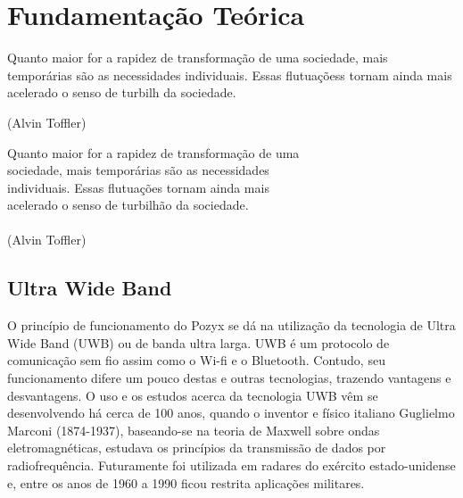 \chapter{Fundamentação Teórica}
\label{chap:fundteor}

\begin{flushright}

   \begin{list}{}{
      \setlength{\leftmargin}{4.5cm}
      \setlength{\rightmargin}{0cm}
      \setlength{\labelwidth}{0pt}
      \setlength{\labelsep}{\leftmargin}}
      \item Quanto maior for a rapidez de transformação de uma
      sociedade, mais temporárias são as necessidades
      individuais. Essas flutuaçõess tornam ainda mais acelerado
      o senso de turbilh da sociedade.

      \begin{list}{}{
      \setlength{\leftmargin}{0cm}
      \setlength{\rightmargin}{0cm}
      \setlength{\labelwidth}{0pt}
      \setlength{\labelsep}{\leftmargin}}
      \item (Alvin Toffler)
      \end{list}
   \end{list}
\end{flushright}

\begin{flushright}
  Quanto maior for a rapidez de transformação de uma \\
  sociedade, mais temporárias são as necessidades \\
  individuais. Essas flutuações tornam ainda mais \\
  acelerado o senso de turbilhão da sociedade. \\
  \ \\
  (Alvin Toffler)
\end{flushright}

\section{Ultra Wide Band}
\label{sec:sota}
O princípio de funcionamento do Pozyx se dá na utilização da tecnologia 
de Ultra Wide Band (UWB) ou de banda ultra larga. UWB é um protocolo de comunicação sem fio
assim como o Wi-fi e o Bluetooth. Contudo, seu funcionamento difere um pouco destas e outras tecnologias,
trazendo vantagens e desvantagens. O uso e os estudos acerca da tecnologia UWB vêm se desenvolvendo
há cerca de 100 anos, quando o inventor e físico italiano Guglielmo Marconi (1874-1937), baseando-se na teoria 
de Maxwell sobre ondas eletromagnéticas, estudava os princípios da transmissão de dados por radiofrequência. Futuramente 
foi utilizada em radares do exército estado-unidense e, entre os anos de 1960 a 1990 ficou restrita aplicações militares.

